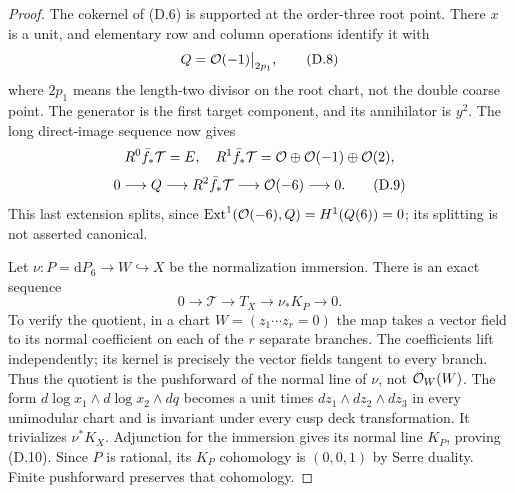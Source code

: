 \begin{proof}
The cokernel of (D.6) is supported at the order-three root point. There
$x$ is a unit, and elementary row and column operations identify it
with
\[
 Q=\mathcal O(-1)\big|_{2p_1},                               \tag{D.8}
\]
where $2p_1$ means the length-two divisor on the root chart, not the
double coarse point. The generator is the first target component,
and its annihilator is $y^2$. The long direct-image sequence now gives
\[
 R^0\bar f_*\mathcal T=E,\quad
 R^1\bar f_*\mathcal T=\mathcal O\oplus\mathcal O(-1)\oplus\mathcal O(2),
\]
\[
 0\longrightarrow Q\longrightarrow R^2\bar f_*\mathcal T
 \longrightarrow\mathcal O(-6)\longrightarrow0.              \tag{D.9}
\]
This last extension splits, since $\operatorname{Ext}^1(\mathcal O(-6),Q)
=H^1(Q(6))=0$; its splitting is not asserted canonical.

Let $\nu:P=\mathrm dP_6\to W\hookrightarrow X$ be the normalization
immersion. There is an exact sequence
\[
 0\longrightarrow\mathcal T\longrightarrow T_X
 \longrightarrow\nu_*K_P\longrightarrow0.             \tag{D.10}
\]
To verify the quotient, in a chart $W=(z_1\cdots z_r=0)$ the map takes
a vector field to its normal coefficient on each of the $r$ separate
branches. The coefficients lift independently; its kernel is precisely
the vector fields tangent to every branch. Thus the quotient is the
pushforward of the normal line of $\nu$, not $\mathcal O_W(W)$.
The form $d\log x_1\wedge d\log x_2\wedge dq$ becomes a unit times
$dz_1\wedge dz_2\wedge dz_3$ in every unimodular chart and is invariant
under every cusp deck transformation. It trivializes $\nu^*K_X$.
Adjunction for the immersion gives its normal line $K_P$, proving
(D.10). Since $P$ is rational, its $K_P$ cohomology is $(0,0,1)$ by
Serre duality. Finite pushforward preserves that cohomology.


\end{proof}

